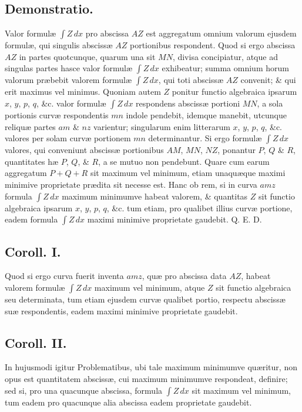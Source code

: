\subsection*{Demonstratio.}
Valor formulæ $\int Z\,dx$ pro abscissa $AZ$ est aggregatum omnium valorum ejusdem formulæ, qui singulis abscissæ $AZ$ portionibus respondent. Quod si ergo abscissa $AZ$ in partes quotcunque, quarum una sit $MN$, divisa concipiatur, atque ad singulas partes hasce valor formulæ $\int Z\,dx$ exhibeatur; summa omnium horum valorum præbebit valorem formulæ $\int Z\,dx$, qui toti abscissæ $AZ$ convenit; \& qui erit maximus vel minimus. Quoniam autem $Z$ ponitur functio algebraica ipsarum $x$, $y$, $p$, $q$, \&c. valor formulæ $\int Z\,dx$ respondens abscissæ portioni $MN$, a sola portionis curvæ respondentis $mn$ indole pendebit, idemque manebit, utcunque reliquæ partes $am$ \& $nz$ varientur; singularum enim litterarum $x$, $y$, $p$, $q$, \&c. valores per solam curvæ portionem $mn$ determinantur. Si ergo formulæ $\int Z\,dx$ valores, qui conveniunt abscissæ portionibus $AM$, $MN$, $NZ$, ponantur $P$, $Q$ \& $R$, quantitates hæ $P$, $Q$, \& $R$, a se mutuo non pendebunt. Quare cum earum aggregatum $P+Q+R$ sit maximum vel minimum, etiam unaquæque maximi minimive proprietate prædita sit necesse est. Hanc ob rem, si in curva $amz$ formula $\int Z\,dx$ maximum minimumve habeat valorem, \& quantitas $Z$ sit functio algebraica ipsarum $x$, $y$, $p$, $q$, \&c. tum etiam, pro qualibet illius curvæ portione, eadem formula $\int Z\,dx$ maximi minimive proprietate gaudebit. Q. E. D.

\subsection*{Coroll. I.}
Quod si ergo curva fuerit inventa $amz$, quæ pro abscissa data $AZ$, habeat valorem formulæ $\int Z\,dx$ maximum vel minimum, atque $Z$ sit functio algebraica seu determinata, tum etiam ejusdem curvæ qualibet portio, respectu abscissæ suæ respondentis, eadem maximi minimive proprietate gaudebit.

\subsection*{Coroll. II.}
In hujusmodi igitur Problematibus, ubi tale maximum minimumve quæritur, non opus est quantitatem abscissæ, cui maximum minimumve respondeat, definire; sed si, pro una quacunque abscissa, formula $\int Z\,dx$ sit maximum vel minimum, tum eadem pro quacunque alia abscissa eadem proprietate gaudebit.

